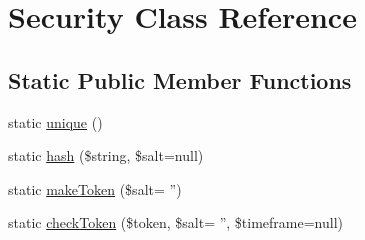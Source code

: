 \hypertarget{classSecurity}{
\section{Security Class Reference}
\label{classSecurity}
}
\subsection*{Static Public Member Functions}
\begin{DoxyCompactItemize}
\item 
static \hyperlink{classSecurity_a8c40107049054e3b49c9af065d6f06bb}{unique} ()
\item 
static \hyperlink{classSecurity_a87f2dc3c881edffaf55bb7dcfcc7d9f5}{hash} (\$string, \$salt=null)
\item 
static \hyperlink{classSecurity_aedcdd63d848d967a4d33b1b2a802c742}{makeToken} (\$salt= '')
\item 
static \hyperlink{classSecurity_ad34f92a1aafbd96e7af9ce283f919d81}{checkToken} (\$token, \$salt= '', \$timeframe=null)
\end{DoxyCompactItemize}


